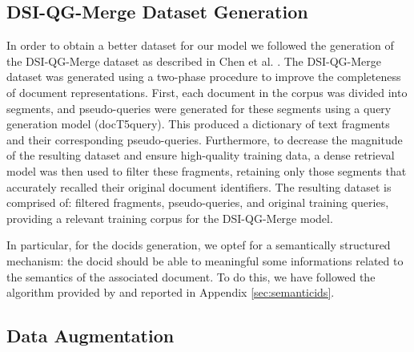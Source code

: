 \subsection{DSI-QG-Merge Dataset Generation}
In order to obtain a better dataset for our model we followed the generation of the DSI-QG-Merge dataset as described in Chen et al. \cite{chen2023understandingdifferentialsearchindex}. The DSI-QG-Merge dataset was generated using a two-phase procedure to improve the completeness of document representations. First, each document in the corpus was divided into segments, and pseudo-queries were generated for these segments using a query generation model (docT5query). This produced a dictionary of text fragments and their corresponding pseudo-queries. Furthermore, to decrease the magnitude of the resulting dataset and ensure high-quality training data, a dense retrieval model was then used to filter these fragments, retaining only those segments that accurately recalled their original document identifiers. The resulting dataset is comprised of: filtered fragments, pseudo-queries, and original training queries, providing a relevant training corpus for the DSI-QG-Merge model.

In particular, for the docids generation, we optef for a semantically structured mechanism: the docid should be able to meaningful some informations related to the semantics of the associated document. To do this, we have followed the algorithm provided by \cite{tay2022transformermemorydifferentiablesearch} and reported in Appendix \ref{sec:semanticids}. 

\subsection{Data Augmentation}


